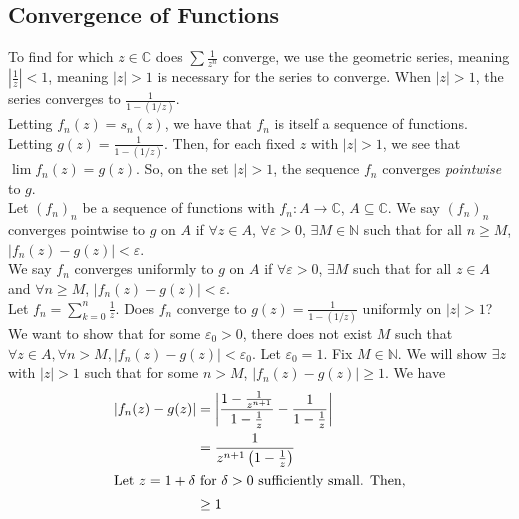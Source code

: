 \documentclass[10pt]{extarticle}
\newcommand{\N}{\mathbb{N}}
\newcommand{\C}{\mathbb{C}}
\begin{document}
  \subsection{Convergence of Functions}%
  To find for which $z\in \C$ does $\sum \frac{1}{z^n}$ converge, we use the geometric series, meaning $\left|\frac{1}{z}\right| < 1$, meaning $|z| > 1$ is necessary for the series to converge. When $|z| > 1$, the series converges to $\frac{1}{1-(1/z)}$.\\

  Letting $f_n(z) = s_n(z)$, we have that $f_n$ is itself a sequence of functions. Letting $g(z) = \frac{1}{1-(1/z)}$. Then, for each fixed $z$ with $|z|>1$, we see that $\lim f_n(z) = g(z)$. So, on the set $|z|>1$, the sequence $f_n$ converges \textit{pointwise} to $g$.\\

  Let $(f_n)_n$ be a sequence of functions with $f_n: A\rightarrow \C$, $A\subseteq \C$. We say $(f_n)_n$ converges pointwise to $g$ on $A$ if $\forall z \in A$, $\forall \varepsilon > 0$, $\exists M\in\N$ such that for all $n\geq M$, $|f_n(z)-g(z)| < \varepsilon$.\\

  We say $f_n$ converges uniformly to $g$ on $A$ if $\forall \varepsilon > 0$, $\exists M$ such that for all $z\in A$ and $\forall n\geq M$, $|f_n(z)-g(z)| < \varepsilon$.\\

  Let $f_n = \sum_{k=0}^{n}\frac{1}{z}$. Does $f_n$ converge to $g(z) = \frac{1}{1-(1/z)}$ uniformly on $|z|>1$?\\

  We want to show that for some $\varepsilon_0 > 0$, there does not exist $M$ such that $\forall z\in A, \forall n > M, |f_n(z)-g(z)| < \varepsilon_0$. Let $\varepsilon_0 = 1$. Fix $M\in \N$. We will show $\exists z$ with $|z| > 1$ such that for some $n > M$, $|f_n(z) - g(z)| \geq 1$. We have
  \begin{align*}
    |f_n(z)-g(z)| &= \left|\frac{1-\frac{1}{z^{n+1}}}{1-\frac{1}{z}} - \frac{1}{1-\frac{1}{z}}\right|\\
                  &= \frac{1}{z^{n+1}\left(1-\frac{1}{z}\right)}\\
                  \intertext{Let $z = 1 + \delta$ for $\delta > 0$ sufficiently small. Then,}
                  &\geq 1
  \end{align*}
\end{document}

